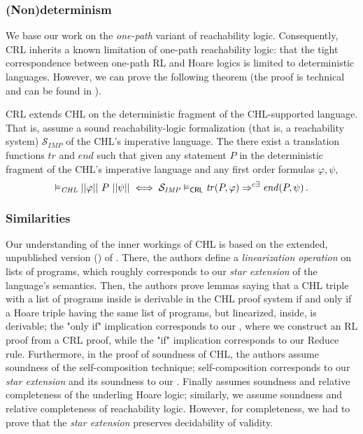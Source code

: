 \subsubsection{(Non)determinism}
We base our work on the \emph{one-path} variant of reachability logic.
Consequently, CRL inherits a known limitation of one-path reachability logic: that the tight correspondence between
one-path RL and Hoare logics is limited to deterministic languages.
However, we can prove the following theorem (the proof is technical and can be found in ).
\begin{theorem}\label{thm:chlCRLrelation}
  CRL extends CHL on the deterministic fragment of the CHL-supported language.
  That is, assume a sound reachability-logic formalization (that is, a reachability system) $\mathcal{S}_{\mathit{IMP}}$ of the CHL's imperative language.
  The there exist a translation functions $\mathit{tr}$ and $\mathit{end}$ such that
  given any statement $P$ in the deterministic fragment of the CHL's imperative language
  and any first order formulas $\varphi, \psi$,
  \begin{equation*}
    \vDash_{\mathit{CHL}} ||\varphi||\ P\ ||\psi||
    \iff
    \mathcal{S}_{\mathit{IMP}} \vDash_\CRL \mathit{tr}(P, \varphi) \Rightarrow^{c\exists} \mathit{end}(P, \psi) \, .
  \end{equation*}
\end{theorem}


\subsubsection{Similarities}

Our understanding of the inner workings of CHL is based on the extended, unpublished version (\cite{SousaD16Extended})
of \cite{SousaD16}.
There, the authors define a \emph{linearization operation} on lists of programs, which roughly corresponds to our
\emph{star extension} of the language's semantics.
Then, the authors prove lemmas saying that a CHL triple with a list of programs inside is derivable
in the CHL proof system
if and only if 
a Hoare triple having the same list of programs, but linearized, inside, is derivable;
the "only if" implication corresponds to our , where we construct
an RL proof from a CRL proof,
while the "if" implication corresponds to our Reduce rule.
Furthermore, in the proof of soundness of CHL, the authors assume soundness of the self-composition technique;
self-composition corresponds to our \emph{star extension} and its soundness to our .
Finally \cite{SousaD16Extended} assumes soundness and relative completeness of the underling Hoare logic;
similarly, we assume soundness and relative completeness of reachability logic.
However, for completeness, we had to prove that the \emph{star extension} preserves decidability of validity.

